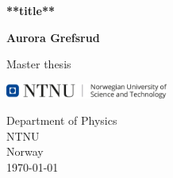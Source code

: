 \begin{titlepage}
   \begin{center}
       \vspace*{1cm}

       \textbf{**title**}
    
       \vspace{1.5cm}

       \textbf{Aurora Grefsrud}

       \vfill
            
       Master thesis\\
            
       \vspace{0.8cm}
     
       \includegraphics[width=0.4\textwidth]{images/ntnu.png}
            
       Department of Physics\\
       NTNU\\
       Norway\\
       \today
            
   \end{center}
\end{titlepage}